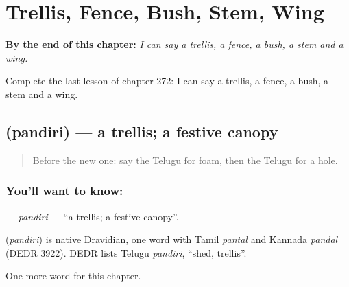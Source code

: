 
\chapter{Trellis, Fence, Bush, Stem, Wing}
\label{ch:te-trellis-fence-bush-stem-wing}

\begin{chapteropening}
\textbf{By the end of this chapter:} \emph{I can say a trellis, a fence, a bush, a stem and a wing.}

Complete the last lesson of chapter 272: I can say a trellis, a fence, a bush, a stem and a wing.
\end{chapteropening}

\section[\texorpdfstring{\te{పందిరి} (pandiri)}{పందిరి (pandiri)}]{ (pandiri) — a trellis; a festive canopy}

\label{lesson:TE-C272-pandiri}



\begin{quote}
Before the new one: say the Telugu for foam, then the Telugu for a hole.
\end{quote}

\subsection*{You'll want to know: }
\textbf{} — \emph{pandiri} — \textquotedblleft{}a trellis; a festive canopy\textquotedblright{}.

\begin{cousinweb}
\textbf{} (\emph{pandiri}) is native Dravidian, one word with Tamil \emph{pantal} and Kannada \emph{pandal} (DEDR 3922). DEDR lists Telugu \emph{pandiri}, \textquotedblleft{}shed, trellis\textquotedblright{}.
\end{cousinweb}

\begin{grammarlens}[title={What you've built}]
One more word for this chapter.
\end{grammarlens}

